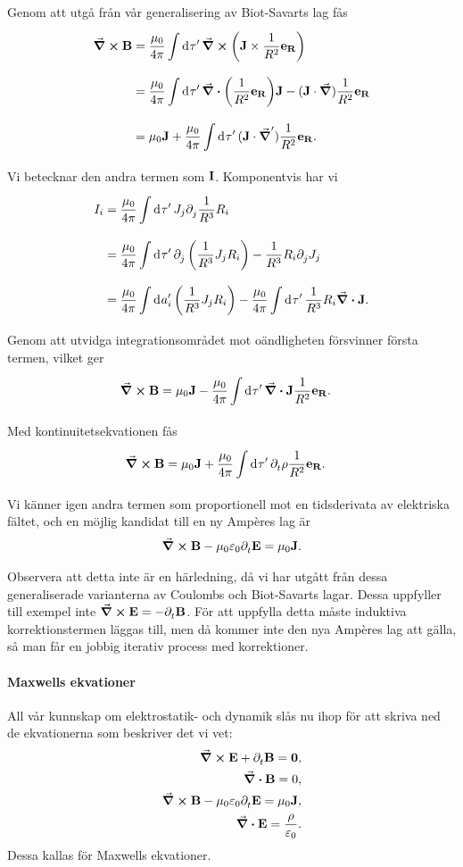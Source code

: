Genom att utgå från vår generalisering av Biot-Savarts lag fås
\begin{align*}
	\curl{\vb{B}} &= \frac{\mu_{0}}{4\pi}\int\limits_{}^{}\dd[]{\tau'}\curl(\vb{J}\times\frac{1}{R^{2}}\vb{e}_{\vb{R}}) \\
	              &= \frac{\mu_{0}}{4\pi}\int\limits_{}^{}\dd[]{\tau'}\div(\frac{1}{R^{2}}\vb{e}_{\vb{R}})\vb{J} - (\vb{J}\cdot\grad)\frac{1}{R^{2}}\vb{e}_{\vb{R}} \\
	              &= \mu_{0}\vb{J} + \frac{\mu_{0}}{4\pi}\int\limits_{}^{}\dd[]{\tau'}(\vb{J}\cdot\grad')\frac{1}{R^{2}}\vb{e}_{\vb{R}}.
\end{align*}
Vi betecknar den andra termen som $\vb{I}$. Komponentvis har vi
\begin{align*}
	I_{i} &= \frac{\mu_{0}}{4\pi}\int\limits_{}^{}\dd[]{\tau'}J_{j}\partial_{j}^{}\frac{1}{R^{3}}R_{i} \\
	      &= \frac{\mu_{0}}{4\pi}\int\limits_{}^{}\dd[]{\tau'}\partial_{j}^{}\left(\frac{1}{R^{3}}J_{j}R_{i}\right) - \frac{1}{R^{3}}R_{i}\partial_{j}^{}J_{j} \\
	      &= \frac{\mu_{0}}{4\pi}\int\limits_{}^{}\dd[]{a_{i}'}\left(\frac{1}{R^{3}}J_{j}R_{i}\right) - \frac{\mu_{0}}{4\pi}\int\limits_{}^{}\dd[]{\tau'}\frac{1}{R^{3}}R_{i}\div{\vb{J}}.
\end{align*}
Genom att utvidga integrationsområdet mot oändligheten försvinner första termen, vilket ger
\begin{align*}
	\curl{\vb{B}} &= \mu_{0}\vb{J} - \frac{\mu_{0}}{4\pi}\int\limits_{}^{}\dd[]{\tau'}\div{\vb{J}}\frac{1}{R^{2}}\vb{e}_{\vb{R}}.
\end{align*}
Med kontinuitetsekvationen fås
\begin{align*}
	\curl{\vb{B}} &= \mu_{0}\vb{J} + \frac{\mu_{0}}{4\pi}\int\limits_{}^{}\dd[]{\tau'}\partial_{t}^{}\rho\frac{1}{R^{2}}\vb{e}_{\vb{R}}.
\end{align*}
Vi känner igen andra termen som proportionell mot en tidsderivata av elektriska fältet, och en möjlig kandidat till en ny Ampères lag är
\begin{align*}
	\curl{\vb{B}} - \mu_{0}\varepsilon_{0}\partial_{t}^{}\vb{E} = \mu_{0}\vb{J}.
\end{align*}

Observera att detta inte är en härledning, då vi har utgått från dessa generaliserade varianterna av Coulombs och Biot-Savarts lagar. Dessa uppfyller till exempel inte $\curl{\vb{E}} = -\partial_{t}^{}\vb{B}$. För att uppfylla detta måste induktiva korrektionstermen läggas till, men då kommer inte den nya Ampères lag att gälla, så man får en jobbig iterativ process med korrektioner.

\paragraph{Maxwells ekvationer}
All vår kunnskap om elektrostatik- och dynamik slås nu ihop för att skriva ned de ekvationerna som beskriver det vi vet:
\begin{align*}
	\curl{\vb{E}} + \partial_{t}^{}\vb{B} = \vb{0}, \\
	\div{\vb{B}} = 0, \\
	\curl{\vb{B}} - \mu_{0}\varepsilon_{0}\partial_{t}^{}\vb{E} = \mu_{0}\vb{J}, \\
	\div{\vb{E}} = \frac{\rho}{\varepsilon_{0}}.
\end{align*}
Dessa kallas för Maxwells ekvationer.

